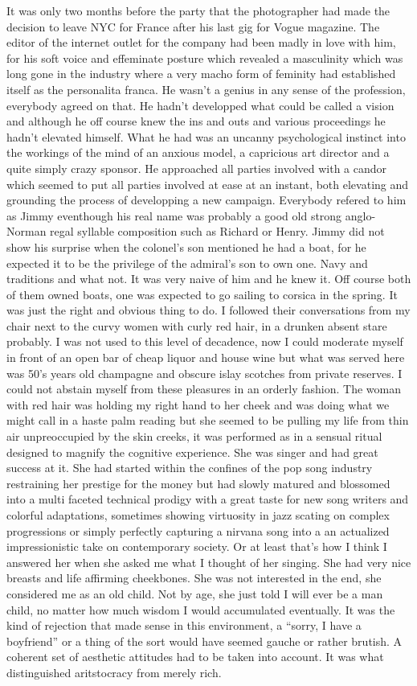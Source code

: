 It was only two months before the party that the photographer had made the
decision to leave NYC for France after his last gig for Vogue magazine. The
editor of the internet outlet for the company had been madly in love with him,
for his soft voice and effeminate posture which revealed a masculinity which
was long gone in the industry where a very macho form of feminity had
established itself as the personalita franca. He wasn’t a genius in any sense
of the profession, everybody agreed on that. He hadn’t developped what could be
called a vision and although he off course knew the ins and outs and various
proceedings he hadn’t elevated himself. What he had was an uncanny
psychological instinct into the workings of the mind of an anxious model, a
capricious art director and a quite simply crazy sponsor. He approached all
parties involved with a candor which seemed to put all parties involved at ease
at an instant, both elevating and grounding the process of developping a new
campaign. Everybody refered to him as Jimmy eventhough his real name was
probably a good old strong anglo-Norman regal syllable composition such as
Richard or Henry. Jimmy did not show his surprise when the colonel’s son
mentioned he had a boat, for he expected it to be the privilege of the
admiral’s son to own one. Navy and traditions and what not. It was very naive
of him and he knew it. Off course both of them owned boats, one was expected to
go sailing to corsica in the spring. It was just the right and obvious thing to
do.  I followed their conversations from my chair next to the curvy women with
curly red hair, in a drunken absent stare probably. I was not used to this
level of decadence, now I could moderate myself in front of an open bar of
cheap liquor and house wine but what was served here was 50’s years old
champagne and obscure islay scotches from private reserves. I could not abstain
myself from these pleasures in an orderly fashion. The woman with red hair was
holding my right hand to her cheek and was doing what we might call in a haste
palm reading but she seemed to be pulling my life from thin air unpreoccupied
by the skin creeks, it was performed as in a sensual ritual designed to magnify
the cognitive experience.  She was singer and had great success at it. She had
started within the confines of the pop song industry restraining her prestige
for the money but had slowly matured and blossomed into a multi faceted
technical prodigy with a great taste for new song writers and colorful
adaptations, sometimes showing virtuosity in jazz scating on complex
progressions or simply perfectly capturing a nirvana song into a an actualized
impressionistic take on contemporary society. Or at least that’s how I think I
answered her when she asked me what I thought of her singing. She had very nice
breasts and life affirming cheekbones. She was not interested in the end, she
considered me as an old child. Not by age, she just told I will ever be a man
child, no matter how much wisdom I would accumulated eventually. It was the
kind of rejection that made sense in this environment, a “sorry, I have a
boyfriend” or a thing of the sort would have seemed gauche or rather brutish. A
coherent set of aesthetic attitudes had to be taken into account. It was what
distinguished aritstocracy from merely rich. 

